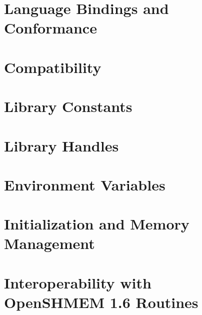 \documentclass[10pt,oneside]{book}
\begin{document}
\section{Language Bindings and Conformance}\label{sec:bindings}



\section{Compatibility}\label{sec:compatibility}



\section{Library Constants}\label{sec:library_constants}



\section{Library Handles}\label{sec:library_handles}



\section{Environment Variables}\label{sec:environment_variables}



\section{Initialization and Memory Management}\label{sec:init_memmgmt}



\section{Interoperability with OpenSHMEM 1.6 Routines}\label{sec:interoperability}


\end{document}
